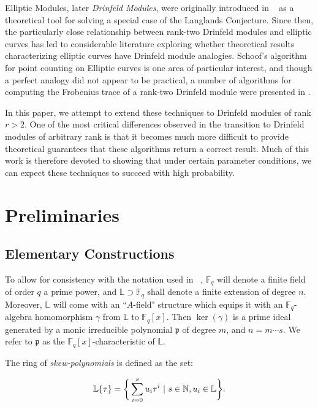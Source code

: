 \documentclass[sigconf]{acmart}
\newcommand{\F}{\mathbb{F}}
\newcommand{\N}{\mathbb{N}}
\renewcommand{\L}{\mathbb{L}}
\begin{document}
Elliptic Modules, later \textit{Drinfeld Modules}, were originally introduced in ~\cite{Drinfeld74} as a theoretical tool for solving a special case of the Langlands Conjecture. Since then, the particularly close relationship between rank-two Drinfeld modules and elliptic curves has led to considerable literature exploring whether theoretical results characterizing elliptic curves have Drinfeld module analogies. Schoof's algorithm for point counting on Elliptic curves is one area of particular interest, and though a perfect analogy did not appear to be practical, a number of algorithms for computing the Frobenius trace of a rank-two Drinfeld module were presented in \cite{MuslehSchost}.

In this paper, we attempt to extend these techniques to Drinfeld modules of rank $r > 2$. One of the most critical differences observed in the transition to Drinfeld modules of arbitrary rank is that it becomes much more difficult to provide theoretical guarantees that these algorithms return a correct result. Much of this work is therefore devoted to showing that under certain parameter conditions, we can expect these techniques to succeed with high probability. 

\section{Preliminaries}

\subsection{Elementary Constructions}
To allow for consistency with the notation used in ~\cite{MuslehSchost}, $\F_q$ will denote a finite field of order $q$ a prime power, and $\L \supset \F_q$ shall denote a finite extension of degree $n$. Moreover, $\L$ will come with an ``$A$-field" structure which equips it with an $\F_q$-algebra homomorphism $\gamma$ from $ \L$ to $\F_q[x]$. Then $\ker(\gamma)$ is a prime ideal generated by a monic irreducible polynomial $\mathfrak{p}$ of degree $m$, and $n = m \cdots s$. We refer to $\mathfrak{p}$ as the $\mathbb{F}_q[x]$-characteristic of $\L$.

The ring of \textit{skew-polynomials} is defined as the set:

\begin{align*}
    \L\{\tau\} = \bigg\{ \sum_{i=0}^su_i\tau^i \textnormal{ | } s \in \N, u_i \in \L \bigg\}.
\end{align*}
\end{document}
